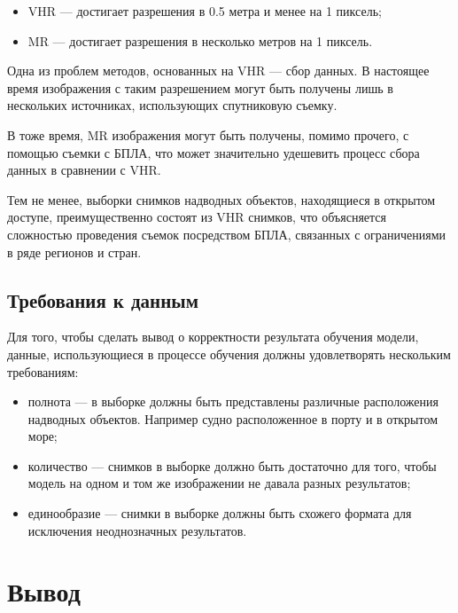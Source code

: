 \begin{itemize}[label=---]
    \item VHR --- достигает разрешения в 0.5 метра и менее на 1 пиксель;
    \item MR --- достигает разрешения в несколько метров на 1 пиксель.
\end{itemize}

Одна из проблем методов, основанных на VHR --- сбор данных. В настоящее время изображения с таким разрешением могут быть получены лишь в нескольких источниках, использующих спутниковую съемку.

В тоже время, MR изображения могут быть получены, помимо прочего, с помощью съемки с БПЛА, что может значительно удешевить процесс сбора данных в сравнении с VHR.

Тем не менее, выборки снимков надводных объектов, находящиеся в открытом доступе, преимущественно состоят из VHR снимков, что объясняется сложностью проведения съемок посредством БПЛА, связанных с ограничениями в ряде регионов и стран.

\subsection{Требования к данным}

Для того, чтобы сделать вывод о корректности результата обучения модели, данные, использующиеся в процессе обучения должны удовлетворять нескольким требованиям:
\begin{itemize}[label=---]
    \item полнота --- в выборке должны быть представлены различные расположения надводных объектов. Например судно расположенное в порту и в открытом море;
    \item количество --- снимков в выборке должно быть достаточно для того, чтобы модель на одном и том же изображении не давала разных результатов;
    \item единообразие --- снимки в выборке должны быть схожего формата для исключения неоднозначных результатов.
\end{itemize}

\section{Вывод}